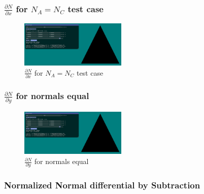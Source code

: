 \documentclass[12pt]{article}
\newcommand{\oneimgwidth}{0.45}
\newcommand{\dnndx}{\frac{\partial N}{\partial x}}
\newcommand{\dnndy}{\frac{\partial N}{\partial y}}
\begin{document}
\FloatBarrier

\subsubsection{$\dnndx$ for $N_A = N_C$ test case}

\begin{figure}[htbp] 
	\centering
	\includegraphics[width=\oneimgwidth\textwidth]{dnn/dnndx_na_nc_equal.png}
	\caption{$\dnndx$ for $N_A = N_C$ test case}
	\label{fig:dndx}
\end{figure}

\FloatBarrier

\subsubsection{$\dnndy$ for normals equal}

\begin{figure}[htbp] 
	\centering
	\includegraphics[width=\oneimgwidth\textwidth]{dnn/dnndx_na_nc_equal.png}
	\caption{$\dnndy$ for normals equal}
	\label{fig:dndx}
\end{figure}

\FloatBarrier

\subsubsection{Normalized Normal differential by Subtraction}
\end{document}
